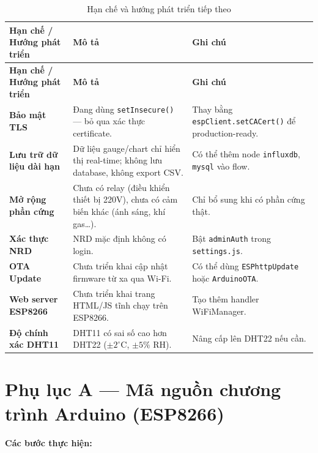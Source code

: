 \documentclass[13pt,a4paper]{article}
\newcommand{\code}[1]{\texttt{#1}}
\begin{document}
\begin{longtable}{|L{4cm}|L{6cm}|L{3.5cm}|}
    \caption{Hạn chế và hướng phát triển tiếp theo}
    \label{tbl:limitations} \\
    \hline
    \textbf{Hạn chế / Hướng phát triển} & \textbf{Mô tả} & \textbf{Ghi chú} \\
    \hline
    \endfirsthead
    \hline
    \textbf{Hạn chế / Hướng phát triển} & \textbf{Mô tả} & \textbf{Ghi chú} \\
    \hline
    \endhead
    \hline
    \endfoot
    \textbf{Bảo mật TLS} & Đang dùng \code{setInsecure()} --- bỏ qua xác thực certificate. & Thay bằng \code{espClient.setCACert()} để production-ready. \\
    \hline
    \textbf{Lưu trữ dữ liệu dài hạn} & Dữ liệu gauge/chart chỉ hiển thị real-time; không lưu database, không export CSV. & Có thể thêm node \code{influxdb}, \code{mysql} vào flow. \\
    \hline
    \textbf{Mở rộng phần cứng} & Chưa có relay (điều khiển thiết bị 220V), chưa có cảm biến khác (ánh sáng, khí gas…). & Chỉ bổ sung khi có phần cứng thật. \\
    \hline
    \textbf{Xác thực NRD} & NRD mặc định không có login. & Bật \code{adminAuth} trong \code{settings.js}. \\
    \hline
    \textbf{OTA Update} & Chưa triển khai cập nhật firmware từ xa qua Wi-Fi. & Có thể dùng \code{ESPhttpUpdate} hoặc \code{ArduinoOTA}. \\
    \hline
    \textbf{Web server ESP8266} & Chưa triển khai trang HTML/JS tĩnh chạy trên ESP8266. & Tạo thêm handler WiFiManager. \\
    \hline
    \textbf{Độ chính xác DHT11} & DHT11 có sai số cao hơn DHT22 ($\pm2^\circ$C, $\pm5\%$ RH). & Nâng cấp lên DHT22 nếu cần. \\
    \hline
\end{longtable}

\appendix
{}
\section*{Phụ lục A --- Mã nguồn chương trình Arduino (ESP8266)}
\label{sec:code}

\textbf{Các bước thực hiện:}
\end{document}
